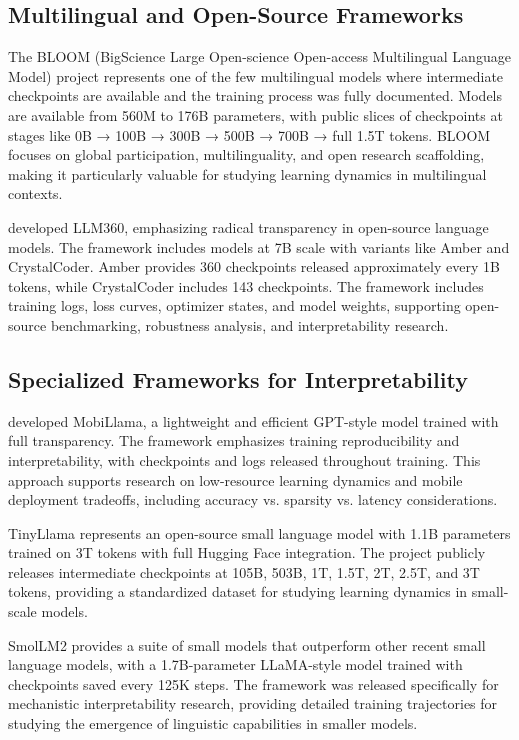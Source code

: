 \subsection{Multilingual and Open-Source Frameworks}

The BLOOM (BigScience Large Open-science Open-access Multilingual Language Model) project represents one of the few multilingual models where intermediate checkpoints are available and the training process was fully documented. Models are available from 560M to 176B parameters, with public slices of checkpoints at stages like 0B → 100B → 300B → 500B → 700B → full 1.5T tokens. BLOOM focuses on global participation, multilinguality, and open research scaffolding, making it particularly valuable for studying learning dynamics in multilingual contexts.

\citet{liu2023llm360} developed LLM360, emphasizing radical transparency in open-source language models. The framework includes models at 7B scale with variants like Amber and CrystalCoder. Amber provides 360 checkpoints released approximately every 1B tokens, while CrystalCoder includes 143 checkpoints. The framework includes training logs, loss curves, optimizer states, and model weights, supporting open-source benchmarking, robustness analysis, and interpretability research.

\subsection{Specialized Frameworks for Interpretability}

\citet{thawakar2024mobillama} developed MobiLlama, a lightweight and efficient GPT-style model trained with full transparency. The framework emphasizes training reproducibility and interpretability, with checkpoints and logs released throughout training. This approach supports research on low-resource learning dynamics and mobile deployment tradeoffs, including accuracy vs. sparsity vs. latency considerations.

TinyLlama represents an open-source small language model with 1.1B parameters trained on 3T tokens with full Hugging Face integration. The project publicly releases intermediate checkpoints at 105B, 503B, 1T, 1.5T, 2T, 2.5T, and 3T tokens, providing a standardized dataset for studying learning dynamics in small-scale models.

SmolLM2 provides a suite of small models that outperform other recent small language models, with a 1.7B-parameter LLaMA-style model trained with checkpoints saved every 125K steps. The framework was released specifically for mechanistic interpretability research, providing detailed training trajectories for studying the emergence of linguistic capabilities in smaller models.

